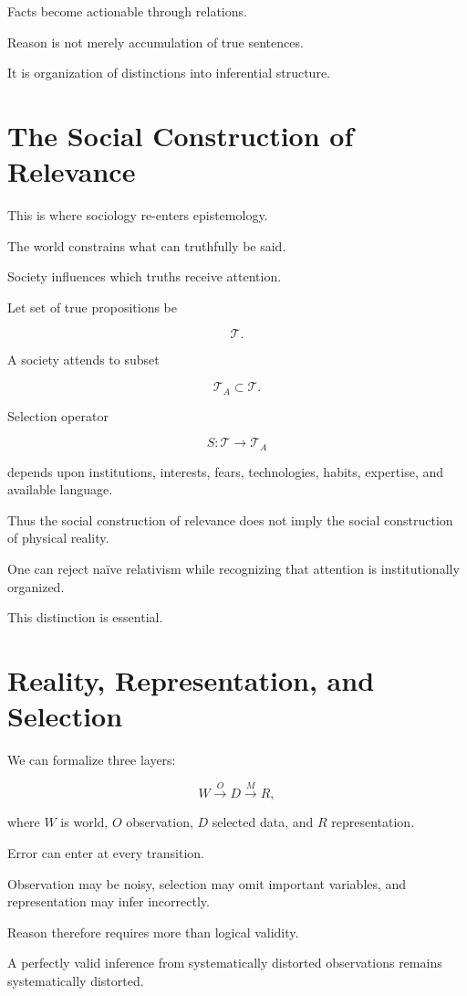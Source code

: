 \documentclass[11pt,oneside]{book}
\theoremstyle{definition}
\theoremstyle{remark}
\begin{document}
Facts become actionable through relations.

Reason is not merely accumulation of true sentences.

It is organization of distinctions into inferential structure.

\section{The Social Construction of Relevance}

This is where sociology re-enters epistemology.

The world constrains what can truthfully be said.

Society influences which truths receive attention.

Let set of true propositions be

\[
\mathcal T.
\]

A society attends to subset

\[
\mathcal T_A\subset\mathcal T.
\]

Selection operator

\[
S:\mathcal T\rightarrow\mathcal T_A
\]

depends upon institutions, interests, fears, technologies, habits, expertise, and available language.

Thus the social construction of relevance does not imply the social construction of physical reality.

One can reject naïve relativism while recognizing that attention is institutionally organized.

This distinction is essential.

\section{Reality, Representation, and Selection}

We can formalize three layers:

\[
W
\xrightarrow{O}
D
\xrightarrow{M}
R,
\]

where \(W\) is world, \(O\) observation, \(D\) selected data, and \(R\) representation.

Error can enter at every transition.

Observation may be noisy, selection may omit important variables, and representation may infer incorrectly.

Reason therefore requires more than logical validity.

A perfectly valid inference from systematically distorted observations remains systematically distorted.
\end{document}
